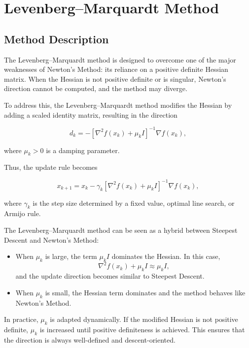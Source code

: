 \documentclass[11pt]{article}
\begin{document}
\section{Levenberg--Marquardt Method}

\subsection{Method Description}

The Levenberg--Marquardt method is designed to overcome one of the major weaknesses of Newton's Method: its reliance on a positive definite Hessian matrix.  
When the Hessian is not positive definite or is singular, Newton’s direction cannot be computed, and the method may diverge.  

To address this, the Levenberg--Marquardt method modifies the Hessian by adding a scaled identity matrix, resulting in the direction

\[
d_k = -\left[\nabla^2 f(x_k) + \mu_k I\right]^{-1} \nabla f(x_k),
\]

where $\mu_k > 0$ is a damping parameter.

Thus, the update rule becomes

\[
x_{k+1} = x_k - \gamma_k \left[\nabla^2 f(x_k) + \mu_k I\right]^{-1} \nabla f(x_k),
\]

where $\gamma_k$ is the step size determined by a fixed value, optimal line search, or Armijo rule.

The Levenberg--Marquardt method can be seen as a hybrid between Steepest Descent and Newton’s Method:
\begin{itemize}
    \item When $\mu_k$ is large, the term $\mu_k I$ dominates the Hessian.  
    In this case,
    \[
    \nabla^2 f(x_k) + \mu_k I \approx \mu_k I,
    \]
    and the update direction becomes similar to Steepest Descent.
    \item When $\mu_k$ is small, the Hessian term dominates and the method behaves like Newton’s Method.
\end{itemize}

In practice, $\mu_k$ is adapted dynamically. If the modified Hessian is not positive definite, $\mu_k$ is increased until positive definiteness is achieved. This ensures that the direction is always well-defined and descent-oriented.
\end{document}
